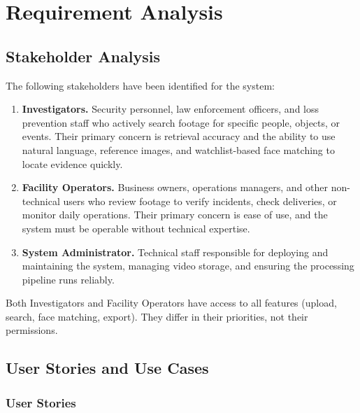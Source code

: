 \chapter{Requirement Analysis}
\label{chap:requirement-analysis}

\section{Stakeholder Analysis}
\label{section:stakeholder-analysis}

The following stakeholders have been identified for the system:

\begin{enumerate}
    \item \textbf{Investigators.} Security personnel, law enforcement officers, and loss prevention staff who actively search footage for specific people, objects, or events. Their primary concern is retrieval accuracy and the ability to use natural language, reference images, and watchlist-based face matching to locate evidence quickly.

    \item \textbf{Facility Operators.} Business owners, operations managers, and other non-technical users who review footage to verify incidents, check deliveries, or monitor daily operations. Their primary concern is ease of use, and the system must be operable without technical expertise.

    \item \textbf{System Administrator.} Technical staff responsible for deploying and maintaining the system, managing video storage, and ensuring the processing pipeline runs reliably.
\end{enumerate}

Both Investigators and Facility Operators have access to all features (upload, search, face matching, export). They differ in their priorities, not their permissions.

\section{User Stories and Use Cases}
\label{section:user-stories-use-cases}

\subsection{User Stories}

